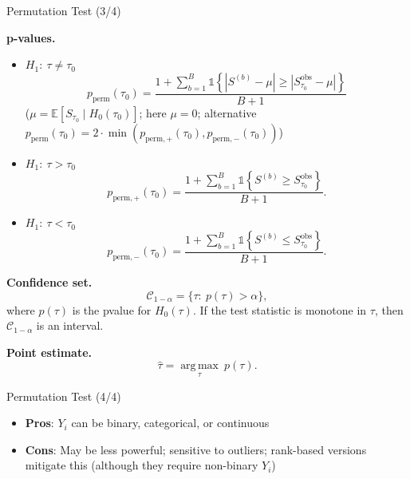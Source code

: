 \documentclass[10pt, handout]{beamer}
\theoremstyle{plain}
\newcommand{\E}{\mathbb{E}}
\newcommand{\indicator}[1]{\mathds{1}{\left\{ #1 \right\}}}
\begin{document}
\begin{frame}{Permutation Test (3/4)}

\footnotesize
\textbf{p-values.}
\begin{itemize}
  \setlength{\itemsep}{5pt}
  \item $H_1:\ \tau \neq \tau_0$ 
  \[
  p_{\text{perm}}(\tau_0)
  = \frac{1+\sum_{b=1}^B \indicator{|S^{(b)}-\mu|\ge|S_{\tau_0}^{\text{obs}}-\mu|}}{B+1}
  \]
  ($\mu = \E[S_{\tau_0} \mid H_0(\tau_0)]$; here $\mu = 0$; alternative $p_{\text{perm}}(\tau_0) = 2 \cdot \min(p_{\text{perm},+}(\tau_0), p_{\text{perm},-}(\tau_0))$)
  \item $H_1:\ \tau>\tau_0$ 
  \[
  p_{\text{perm},+}(\tau_0)
  = \frac{1+\sum_{b=1}^B \indicator{S^{(b)}\ge S_{\tau_0}^{\text{obs}}}}{B+1}.
  \]
  \item $H_1:\ \tau<\tau_0$
  \[
  p_{\text{perm},-}(\tau_0)
  = \frac{1+\sum_{b=1}^B \indicator{S^{(b)}\le S_{\tau_0}^{\text{obs}}}}{B+1}.
  \]
\end{itemize}

\pause

\textbf{Confidence set.}
\[
\mathcal C_{1-\alpha}=\{\tau:\ p(\tau)>\alpha\},
\]
where \(p(\tau)\) is the p\textendash value for \(H_0(\tau)\).
If the test statistic is monotone in \(\tau\), then \(\mathcal C_{1-\alpha}\) is an interval.

\pause

\bigskip
\textbf{Point estimate.}
\[
\hat\tau=\operatorname*{arg\,max}_{\tau}\ p(\tau).
\]

\end{frame}



\begin{frame}{Permutation Test (4/4)}
\begin{itemize}
    \item \textbf{Pros}: $Y_i$ can be binary, categorical, or continuous

    \vspace{0.5em}
    \item \textbf{Cons}: May be less powerful; sensitive to outliers; rank-based versions mitigate this (although they require non-binary $Y_i$)
\end{itemize}
\end{frame}
\end{document}
